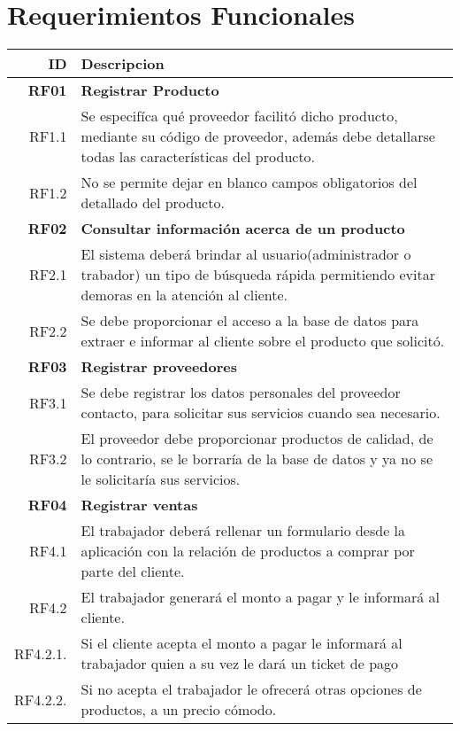 \documentclass[a4paper,11pt, spanish]{report}
\begin{document}
{{{{{{{{{{{{  \section{Requerimientos Funcionales}
  {\renewcommand{\arraystretch}{1.31}%
    \begin{longtable}{r|p{4.1in}}
          \textbf{\Large ID} & \textbf{\Large Descripcion}\\ \hline
      \textbf{\large RF01} & \textbf{\large Registrar Producto} \\ 
      RF1.1 & Se especifíca qué proveedor facilitó dicho producto, mediante su código de proveedor, además debe detallarse todas las características del producto.\\
      RF1.2 & No se permite dejar en blanco campos obligatorios del detallado del producto. \\ \hline
      \textbf{\large RF02} & \textbf{\large Consultar información acerca de un producto} \\
      RF2.1 & El sistema deberá brindar al usuario(administrador o trabador) un tipo de búsqueda rápida permitiendo evitar demoras en la atención al cliente. \\
      RF2.2 & Se debe proporcionar el acceso a la base de datos para extraer e informar al cliente sobre el producto que solicitó. \\ \hline
      \textbf{\large RF03} & \textbf{\large Registrar proveedores} \\
      RF3.1 & Se debe registrar los datos personales del proveedor contacto, para solicitar sus servicios cuando sea necesario. \\
      RF3.2 & El proveedor debe proporcionar productos de calidad, de lo contrario, se le borraría de la base de datos y ya no se le solicitaría sus servicios.\\ \hline
      \textbf{\large RF04} & \textbf{\large Registrar ventas} \\
      RF4.1 & El trabajador deberá rellenar un formulario desde la aplicación con la relación de productos a comprar por parte del cliente.\\
      RF4.2 & El trabajador generará el monto a pagar y le informará al cliente.\\
      RF4.2.1. & Si el cliente acepta el monto a pagar le informará al trabajador quien a su vez le dará un ticket de pago\\
      RF4.2.2. & Si no acepta el trabajador le ofrecerá otras  opciones de productos, a un precio cómodo. \\ \hline

\end{longtable}}}}}}}}}}}}}}
\end{document}
